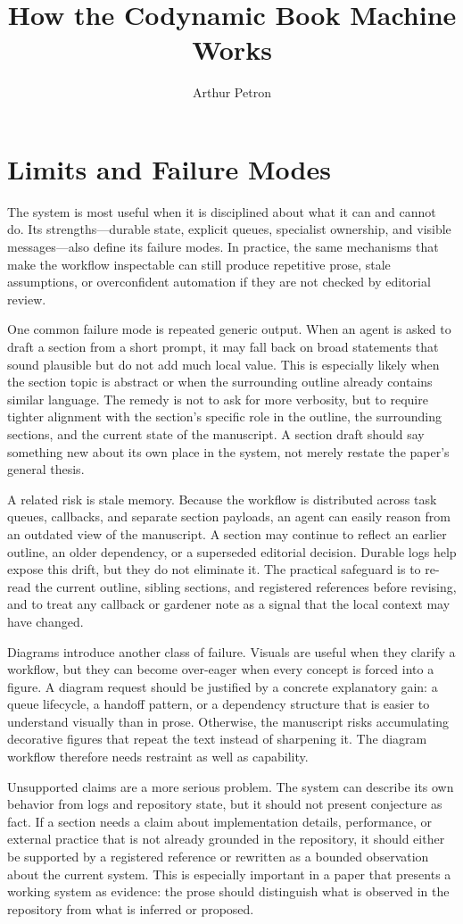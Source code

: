 \documentclass[11pt]{article}
\title{How the Codynamic Book Machine Works}
\author{Arthur Petron}
\begin{document}
\section*{Limits and Failure Modes}

The system is most useful when it is disciplined about what it can and cannot do. Its strengths---durable state, explicit queues, specialist ownership, and visible messages---also define its failure modes. In practice, the same mechanisms that make the workflow inspectable can still produce repetitive prose, stale assumptions, or overconfident automation if they are not checked by editorial review.

One common failure mode is repeated generic output. When an agent is asked to draft a section from a short prompt, it may fall back on broad statements that sound plausible but do not add much local value. This is especially likely when the section topic is abstract or when the surrounding outline already contains similar language. The remedy is not to ask for more verbosity, but to require tighter alignment with the section's specific role in the outline, the surrounding sections, and the current state of the manuscript. A section draft should say something new about its own place in the system, not merely restate the paper's general thesis.

A related risk is stale memory. Because the workflow is distributed across task queues, callbacks, and separate section payloads, an agent can easily reason from an outdated view of the manuscript. A section may continue to reflect an earlier outline, an older dependency, or a superseded editorial decision. Durable logs help expose this drift, but they do not eliminate it. The practical safeguard is to re-read the current outline, sibling sections, and registered references before revising, and to treat any callback or gardener note as a signal that the local context may have changed.

Diagrams introduce another class of failure. Visuals are useful when they clarify a workflow, but they can become over-eager when every concept is forced into a figure. A diagram request should be justified by a concrete explanatory gain: a queue lifecycle, a handoff pattern, or a dependency structure that is easier to understand visually than in prose. Otherwise, the manuscript risks accumulating decorative figures that repeat the text instead of sharpening it. The diagram workflow therefore needs restraint as well as capability.

Unsupported claims are a more serious problem. The system can describe its own behavior from logs and repository state, but it should not present conjecture as fact. If a section needs a claim about implementation details, performance, or external practice that is not already grounded in the repository, it should either be supported by a registered reference or rewritten as a bounded observation about the current system. This is especially important in a paper that presents a working system as evidence: the prose should distinguish what is observed in the repository from what is inferred or proposed.
\end{document}
